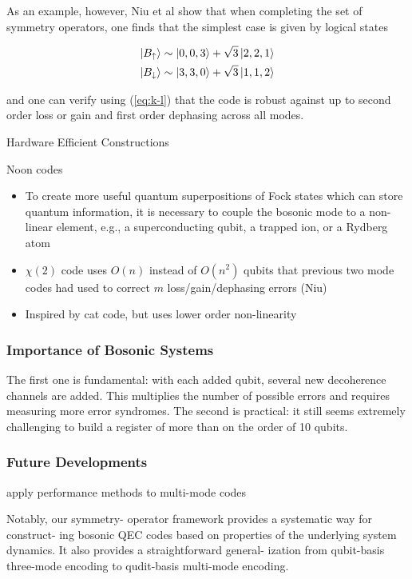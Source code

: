 \documentclass[12]{amsart}
\newcommand\0{\mathbf{0}}
\newcommand\<{\langle}
\renewcommand\>{\rangle}
\begin{document}
As an example, however, Niu et al show that when completing the set of symmetry operators, one finds that the simplest case is given by logical states

\begin{align*}
	\ket{B_{\uparrow}} &\sim \ket{0, 0, 3} + \sqrt{3}\ket{2, 2, 1}\\
	\ket{B_{\downarrow}} &\sim \ket{3, 3, 0} + \sqrt{3}\ket{1, 1, 2}
\end{align*}

and one can verify using (\ref{eq:k-l}) that the code is robust against up to second order loss or gain and first order dephasing across all modes.

Hardware Efficient Constructions

Noon codes

\begin{itemize}
	\item To create more useful quantum superpositions of Fock states which can store quantum information, it is necessary to couple the bosonic mode to a non-linear element, e.g., a superconducting qubit, a trapped ion, or a Rydberg atom
		\item $\chi(2)$ code uses $O(n)$ instead of $O(n^2)$ qubits that previous two mode codes had used to correct $m$ loss/gain/dephasing errors (Niu)
		\item Inspired by cat code, but uses lower order non-linearity
	\end{itemize}

\subsubsection{Importance of Bosonic Systems}

The first one is fundamental: with each added qubit, several new decoherence channels are added. This multiplies the number of possible errors and requires measuring more error syndromes. The second is practical: it still seems extremely challenging to build a register of more than on the order of 10 qubits.

\subsubsection{Future Developments}

apply performance methods to multi-mode codes

Notably, our symmetry- operator framework provides a systematic way for construct- ing bosonic QEC codes based on properties of the underlying system dynamics. It also provides a straightforward general- ization from qubit-basis three-mode encoding to qudit-basis multi-mode encoding.

\nocite{*}


\end{document}
